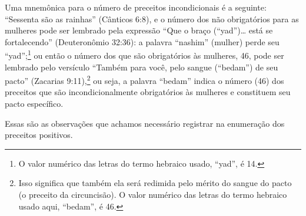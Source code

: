 Uma mnemônica para o número de preceitos incondicionais é a seguinte: ``Sessenta são as rainhas'' (Cânticos 6:8), e o número dos não obrigatórios para as mulheres pode ser lembrado pela expressão ``Que o braço (``yad'')\ldots{} está se fortalecendo'' (Deuteronômio 32:36): a palavra ``nashim'' (mulher)
perde seu ``yad'';\footnote{O valor numérico das letras do termo hebraico usado, ``yad'', é 14.} ou então o número dos que são
obrigatórios às mulheres, 46, pode ser lembrado pelo versículo ``Também para você, pelo sangue (``bedam'') de seu pacto'' (Zacarias 9:11),\footnote{Isso significa que também ela será redimida pelo mérito do sangue do
  pacto (o preceito da circuncisão). O valor numérico das letras do
  termo hebraico usado aqui, ``bedam'', é 46.} ou seja, a
palavra ``bedam'' indica o número (46) dos preceitos que são incondicionalmente obrigatórios às mulheres e constituem seu pacto específico.

Essas são as observações que achamos necessário registrar na enumeração
dos preceitos positivos.

